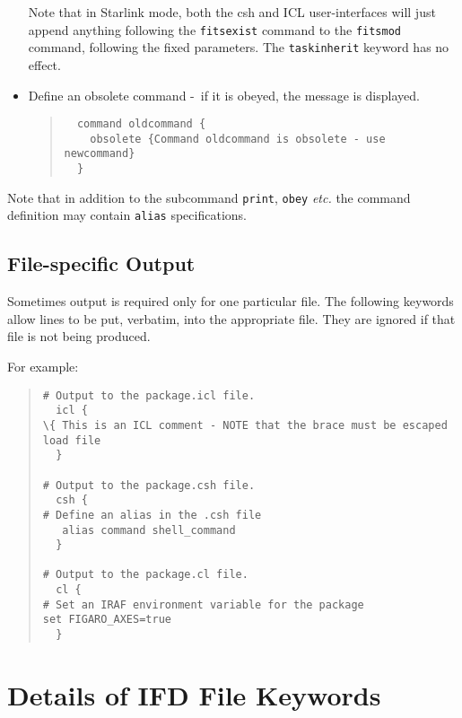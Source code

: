 \documentclass[twoside,11pt]{article}
\newcommand{\xlabel}[1]{}
\newcommand{\dash}{--}
\renewcommand{\dash}{-}
\begin{document}
\begin{itemize}
Note that in Starlink mode, both the csh and ICL user-interfaces will just
append anything following the \texttt{fitsexist} command to the 
\texttt{fitsmod} command, following the fixed parameters. The
\texttt{taskinherit} keyword has no effect.
\item Define an obsolete command \dash\ if it is obeyed, the message is 
displayed.
\begin{quote} \begin{verbatim}
  command oldcommand {
    obsolete {Command oldcommand is obsolete - use newcommand}
  }
\end{verbatim} \end{quote}
\end{itemize}

Note that in addition to the subcommand \texttt{print}, \texttt{obey} 
\textit{etc.} the command definition may contain \texttt{alias} 
specifications.

\subsection{\xlabel{filespecific_output}File-specific Output}
Sometimes output is required only for one particular file. The following
keywords allow lines to be put, verbatim, into the appropriate file.
They are ignored if that file is not being produced.

For example:

\begin{quote} \begin{verbatim}
# Output to the package.icl file.
  icl {
\{ This is an ICL comment - NOTE that the brace must be escaped
load file
  }

# Output to the package.csh file.
  csh {
# Define an alias in the .csh file
   alias command shell_command
  }

# Output to the package.cl file.
  cl {
# Set an IRAF environment variable for the package
set FIGARO_AXES=true
  }
\end{verbatim} \end{quote}

\newpage
\section{\xlabel{details_of_ifd_file_keywords}\label{keywords}Details of IFD 
File Keywords}
\end{document}

